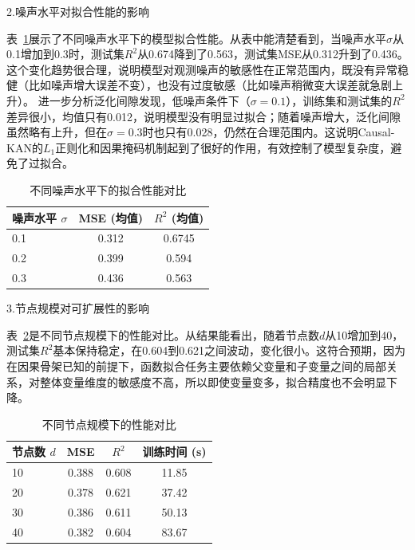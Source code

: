 {\hei 2.噪声水平对拟合性能的影响}{\label{subsubsec:noise_analysis}}

表~\ref{tab:noise_analysis}展示了不同噪声水平下的模型拟合性能。从表中能清楚看到，当噪声水平$\sigma$从0.1增加到0.3时，测试集$R^2$从0.674降到了0.563，测试集MSE从0.312升到了0.436。这个变化趋势很合理，说明模型对观测噪声的敏感性在正常范围内，既没有异常稳健（比如噪声增大误差不变），也没有过度敏感（比如噪声稍微变大误差就急剧上升）。
进一步分析泛化间隙发现，低噪声条件下（$\sigma=0.1$），训练集和测试集的$R^2$差异很小，均值只有0.012，说明模型没有明显过拟合；随着噪声增大，泛化间隙虽然略有上升，但在$\sigma=0.3$时也只有0.028，仍然在合理范围内。这说明Causal-KAN的$L_1$正则化和因果掩码机制起到了很好的作用，有效控制了模型复杂度，避免了过拟合。
\begin{table}[htbp]
	\centering
	\caption{不同噪声水平下的拟合性能对比}{\label{tab:noise_analysis}}
	\begin{tabular}{lcc}
		\toprule
		噪声水平 $\sigma$ & MSE (均值) & $R^2$ (均值) \\
		\midrule
		0.1 & 0.312 & 0.6745  \\
		0.2 & 0.399 & 0.594  \\
		0.3 & 0.436 & 0.563  \\
		\bottomrule
	\end{tabular}
\end{table}

{\hei 3.节点规模对可扩展性的影响}{\label{subsubsec:scalability_analysis}}

表~\ref{tab:scalability_analysis}是不同节点规模下的性能对比。从结果能看出，随着节点数$d$从10增加到40，测试集$R^2$基本保持稳定，在0.604到0.621之间波动，变化很小。这符合预期，因为在因果骨架已知的前提下，函数拟合任务主要依赖父变量和子变量之间的局部关系，对整体变量维度的敏感度不高，所以即使变量变多，拟合精度也不会明显下降。
\begin{table}[htbp]
	\centering
	\caption{不同节点规模下的性能对比}{\label{tab:scalability_analysis}}
	\begin{tabular}{lccc}
		\toprule
		节点数 $d$ & MSE & $R^2$ & 训练时间 (s) \\
		\midrule
		10 & 0.388 & 0.608 & 11.85 \\
		20 & 0.378 & 0.621 & 37.42 \\
		30 & 0.386 & 0.611 & 50.13 \\
		40 & 0.382 & 0.604 & 83.67 \\
		\bottomrule
	\end{tabular}
\end{table}

